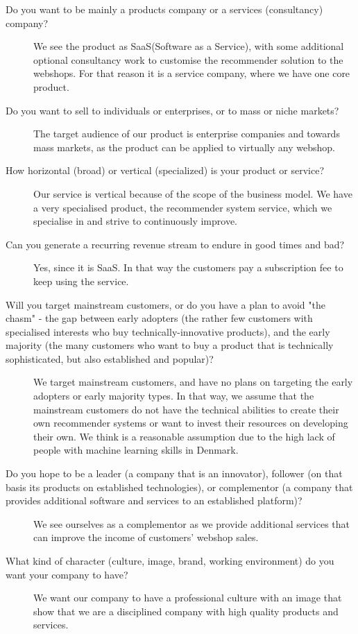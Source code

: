 \begin{description}
	\item[Do  you  want  to  be  mainly  a  products  company  or  a  services  (consultancy)  company?] We see the product as SaaS(Software as a Service), with some additional optional consultancy work to customise the recommender solution to the webshops. For that reason it is a service company, where we have one core product.
	\item[Do  you  want  to  sell  to  individuals  or  enterprises,  or  to  mass  or  niche  markets?] The target audience of our product is enterprise companies and towards mass markets, as the product can be applied to virtually any webshop.
	\item[How  horizontal  (broad)  or  vertical  (specialized)  is  your  product  or  service?] Our service is vertical because of the scope of the business model. We have a very specialised product, the recommender system service, which we specialise in and strive to continuously improve.
	\item[Can  you  generate  a  recurring  revenue  stream  to  endure  in  good  times  and  bad?] Yes, since it is SaaS. In that way the customers pay a subscription fee to keep using the service.
	\item[Will  you  target  mainstream  customers,  or  do  you  have  a  plan  to  avoid  "the  chasm" - the gap between early adopters (the  rather  few  customers  with  specialised  interests  who  buy technically-innovative products),  and  the  early  majority  (the  many  customers  who  want  to buy  a  product  that  is  technically  sophisticated, but  also  established  and  popular)?] We target mainstream customers, and have no plans on targeting the early adopters or early majority types. In that way, we assume that the mainstream customers do not have the technical abilities to create their own recommender systems or want to invest their resources on developing their own. We think is a reasonable assumption due to the high lack of people with machine learning skills in Denmark.
	\item[Do  you  hope  to  be  a  leader  (a  company  that  is  an  innovator),  follower  (on  that basis  its products  on  established  technologies),  or  complementor  (a  company  that  provides additional  software  and  services  to  an  established  platform)?] We see ourselves as a complementor as we provide additional services that can improve the income of customers' webshop sales.
	\item[What  kind  of  character  (culture,  image,  brand,  working  environment)  do  you  want  your company  to  have?] We want our company to have a professional culture with an image that show that we are a disciplined company with high quality products and services.
\end{description}
